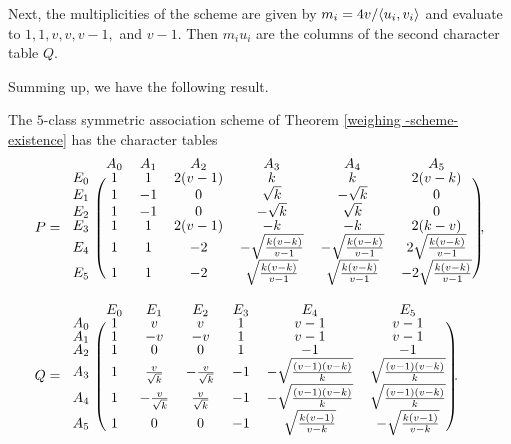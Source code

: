 \documentclass[../../../main]{subfiles}
\begin{document}
Next, the multiplicities of the scheme are given by $m_i = 4v/\langle u_i,v_i\rangle$ and evaluate to $1,1,v,v,v-1,$ and $v-1$. Then $m_iu_i$ are the columns of the second character table $Q$.

Summing up, we have the following result.

\begin{thm}\label{weighing-scheme-character-tables}
 The $5$-class symmetric association scheme of Theorem \ref{weighing -scheme-existence} has the character tables
  \begin{align*}
   P &=
   \arraycolsep=1.0pt\def\arraystretch{0.75}
   \begin{blockarray}{ccccccc}
     & A_0 & A_1 & A_2 & A_3 & A_4 & A_5 \\
    \begin{block}{c(cccccc)}
     E_0 & 1 & 1 & 2(v-1) & k & k & 2(v-k) \\
     E_1 & 1 & -1 & 0 & \sqrt{k} & -\sqrt{k} & 0 \\
     E_2 & 1 & -1 & 0 & -\sqrt{k} & \sqrt{k} & 0 \\
     E_3 & 1 & 1 & 2(v-1) & -k & -k & 2(k-v) \\
     E_4 & 1 & 1 & -2 & -\sqrt{\frac{k(v-k)}{v-1}} & -\sqrt{\frac{k(v-k)}{v-1}} & 2\sqrt{\frac{k(v-k)}{v-1}} \\
     E_5 & 1 & 1 & -2 & \sqrt{\frac{k(v-k)}{v-1}} & \sqrt{\frac{k(v-k)}{v-1}} & -2\sqrt{\frac{k(v-k)}{v-1}} \\
    \end{block}
   \end{blockarray}, \\
   Q &=
   \arraycolsep=1.0pt\def\arraystretch{0.75}
   \begin{blockarray}{ccccccc}
     & E_0 & E_1 & E_2 & E_3 & E_4 & E_5 \\
    \begin{block}{c(cccccc)}
     A_0 & 1 & v & v & 1 & v-1 & v-1 \\
     A_1 & 1 & -v & -v & 1 & v-1 & v-1 \\
     A_2 & 1 & 0 & 0 & 1 & -1 & -1 \\
     A_3 & 1 & \frac{v}{\sqrt{k}} & -\frac{v}{\sqrt{k}} & -1 & -\sqrt{\frac{(v-1)(v-k)}{k}} & \sqrt{\frac{(v-1)(v-k)}{k}} \\
     A_4 & 1 & -\frac{v}{\sqrt{k}} & \frac{v}{\sqrt{k}} & -1 & -\sqrt{\frac{(v-1)(v-k)}{k}} & \sqrt{\frac{(v-1)(v-k)}{k}} \\
     A_5 & 1 & 0 & 0 & -1 & \sqrt{\frac{k(v-1)}{v-k}} & -\sqrt{\frac{k(v-1)}{v-k}} \\
    \end{block}
   \end{blockarray}.
  \end{align*}
\end{thm}
\end{document}
